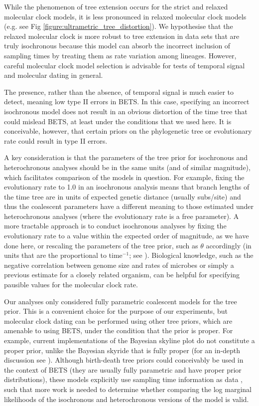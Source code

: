 \documentclass[10pt,letterpaper]{article}
\begin{document}
While the phenomenon of tree extension occurs for the strict and relaxed molecular clock models, it is less pronounced in relaxed molecular clock models (e.g. see Fig \ref{figure:ultrametric_tree_distortion}). We hypothesise that the relaxed molecular clock is more robust to tree extension in data sets that are truly isochronous because this model can absorb the incorrect inclusion of sampling times by treating them as rate variation among lineages. {However, careful molecular clock model selection is advisable for tests of temporal signal and molecular dating in general.}

The presence, rather than the absence, of temporal signal is much easier to detect, meaning low type II errors in BETS. In this case, specifying an incorrect isochronous model does not result in an obvious distortion of the time tree that could mislead BETS, at least under the conditions that we used here. It is conceivable, however, that certain priors on the phylogenetic tree or evolutionary rate could result in type II errors. 

A key consideration is that the parameters of the tree prior for isochronous and heterochronous analyses should be in the same units (and of similar magnitude), which facilitates comparison of the models in question. For example, fixing the evolutionary rate to 1.0 in an isochronous analysis means that branch lengths of the time tree are in units of expected genetic distance (usually subs/site) and thus the coalescent parameters have a different meaning to those estimated under heterochronous analyses (where the evolutionary rate is a free parameter). {A more tractable approach is to conduct isochronous analyses by fixing the evolutionary rate to a value within the expected order of magnitude, as we have done here, or rescaling the parameters of the tree prior, such as $\theta$ accordingly (in units that are the proportional to time$^{-1}$; see \cite{boskova2014inference}).} Biological knowledge, such as the negative correlation between genome size and rates of microbes \cite{sanjuan2012molecular, duchene2016genome} or simply a previous estimate for a closely related organism, can be helpful for specifying pausible values for the molecular clock rate.

{Our analyses only considered fully parametric coalescent models for the tree prior. This is a convenient choice for the purpose of our experiments, but molecular clock dating can be performed using other tree priors, which are amenable to using BETS, under the condition that the prior is proper. For example, current implementations of the Bayesian skyline plot do not constitute a proper prior, unlike the Bayesian skyride that is fully proper (for an in-depth discussion see \cite{baele2014bayesian}). Although birth-death tree priors could conceivably be used in the context of BETS (they are usually fully parametric and have proper prior distributions), these models explicitly use sampling time information as data \cite{boskova2018influence}, such that more work is needed to determine whether comparing the log marginal likelihoods of the isochronous and heterochronous versions of the model is valid.}
\end{document}

